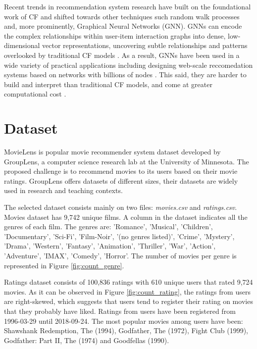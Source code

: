 \documentclass[12pt]{article}
\numberwithin{equation}{section}
\begin{document}
Recent trends in recommendation system research have built on the foundational work of CF and shifted towards other techniques such random walk processes \cite{prob_s} and, more prominently, Graphical Neural Networks (GNN). GNNs can encode the complex relationships within user-item interaction graphs into dense, low-dimensional vector representations,  uncovering subtle relationships and patterns overlooked by traditional CF models . As a result, GNNs have been used in a wide variety of practical applications including designing web-scale reccomedation systems based on networks with billions of nodes \cite{GNNwebscale}. This said, they are harder to build and interpret than traditional CF models, and come at greater computational cost \cite{collab_f}. 

\section{Dataset}

MovieLens is popular movie recommender system dataset developed by GroupLens, a computer science research lab at the University of Minnesota. The proposed challenge is to recommend movies to its users based on their movie ratings. GroupLens offers datasets of different sizes, their datasets are widely used in research and teaching contexts.

The selected dataset consists mainly on two files: \textit{movies.csv} and  \textit{ratings.csv}. Movies dataset has 9,742 unique films. A column in the dataset indicates all the genres of each film. The genres are: 'Romance', 'Musical', 'Children', 'Documentary', 'Sci-Fi', 'Film-Noir', '(no genres listed)', 'Crime', 'Mystery', 'Drama', 'Western', 'Fantasy', 'Animation', 'Thriller', 'War', 'Action', 'Adventure', 'IMAX', 'Comedy', 'Horror'. The number of movies per genre is represented in Figure \ref{fig:count_genre}.

Ratings dataset consists of 100,836 ratings with 610 unique users that rated 9,724 movies. As it can be observed in Figure \ref{fig:count_rating}, the ratings from users are right-skewed, which suggests that users tend to register their rating on movies that they probably have liked. Ratings from users have been registered from 1996-03-29 until 2018-09-24. The most popular movies among users have been: Shawshank Redemption, The (1994), Godfather, The (1972), Fight Club (1999), Godfather: Part II, The (1974) and Goodfellas (1990).
\end{document}

